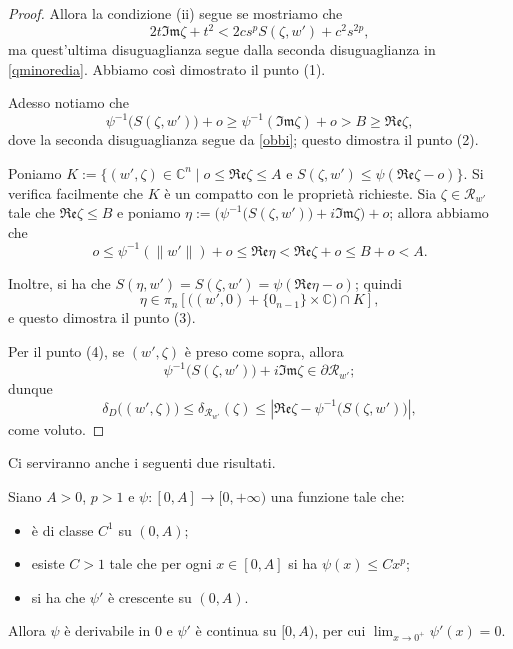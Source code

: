 \begin{proof}
    Allora la condizione (ii) segue se mostriamo che
    $$2t\mathfrak{Im}\zeta+t^2<2cs^pS(\zeta,w')+c^2s^{2p},$$
    ma quest'ultima disuguaglianza segue dalla seconda disuguaglianza in \eqref{qminoredia}. Abbiamo così dimostrato il punto (1).

    Adesso notiamo che
    $$\psi^{-1}\big(S(\zeta,w')\big)+o \ge \psi^{-1}(\mathfrak{Im}\zeta)+o>B\ge\mathfrak{Re}\zeta,$$
    dove la seconda disuguaglianza segue da \eqref{obbi}; questo dimostra il punto (2).

    Poniamo $K:=\{(w',\zeta)\in\mathbb{C}^n\mid o\le\mathfrak{Re}\zeta\le A\text{ e }S(\zeta,w')\le\psi(\mathfrak{Re}\zeta-o)\}$. Si verifica facilmente che $K$ è un compatto con le proprietà richieste. Sia $\zeta\in\mathcal{R}_{w'}$ tale che $\mathfrak{Re}\zeta\le B$ e poniamo $\eta:=\Big(\psi^{-1}\big(S(\zeta,w')\big)+i\mathfrak{Im}\zeta\Big)+o$; allora abbiamo che
    $$o\le\psi^{-1}(\|w'\|)+o\le\mathfrak{Re}\eta<\mathfrak{Re}\zeta+o\le B+o<A.$$

    Inoltre, si ha che $S(\eta,w')=S(\zeta,w')=\psi(\mathfrak{Re}\eta-o)$; quindi
    $$\eta\in\pi_n\left[\big((w',0)+\{0_{n-1}\}\times\mathbb{C}\big)\cap K\right],$$
    e questo dimostra il punto (3).

    Per il punto (4), se $(w',\zeta)$ è preso come sopra, allora
    $$\psi^{-1}\big(S(\zeta,w')\big)+i\mathfrak{Im}\zeta\in\partial\mathcal{R}_{w'};$$
    dunque
    $$\delta_D\big((w',\zeta)\big)\le \delta_{\mathcal{R}_{w'}}(\zeta)\le\left|\mathfrak{Re}\zeta-\psi^{-1}\big(S(\zeta,w')\big)\right|,$$
    come voluto.
\end{proof}

Ci serviranno anche i seguenti due risultati.

\begin{lm} \label{analisibase}
    Siano $A>0$, $p>1$ e $\psi:[0,A]\longrightarrow[0,+\infty)$ una funzione tale che:
    \begin{itemize}
        \item è di classe $C^1$ su $(0,A)$;
        \item esiste $C>1$ tale che per ogni $x\in[0,A]$ si ha $\psi(x) \le Cx^{p}$;
        \item si ha che $\psi'$ è crescente su $(0,A)$.
    \end{itemize}

    Allora $\psi$ è derivabile in $0$ e $\psi'$ è continua su $[0,A)$, per cui $\displaystyle\lim_{x\longrightarrow0^+}\psi'(x)=0$.
\end{lm}

